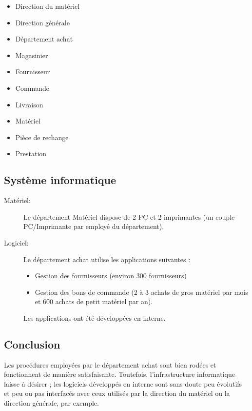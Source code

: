 \begin{itemize}
\item Direction du matériel
\item Direction générale
\item Département achat
\item Magasinier
\item Fournisseur
\item Commande
\item Livraison
\item Matériel
\item Pièce de rechange
\item Prestation
\end{itemize}


\subsection{Système informatique}

\begin{description}
    \item [Matériel:]\el
Le département Matériel dispose de 2 PC et 2 imprimantes (un couple
PC/Imprimante par employé du département).

    \item [Logiciel:]\el
Le département achat utilise les applications suivantes :
    \begin{itemize}
\item Gestion des fournisseurs (environ 300 fournisseurs)
\item Gestion des bons de commande (2 à 3 achats de gros matériel par mois
        et 600 achats de petit matériel par an).
    \end{itemize}

Les applications ont été développées en interne.

\end{description}

\subsection{Conclusion}

Les procédures employées par le département achat sont bien rodées et
fonctionnent de manière satisfaisante. Toutefois, l'infrastructure
informatique laisse à désirer ; les logiciels développés en interne sont
sans doute peu évolutifs et peu ou pas interfacés avec ceux utilisés par la
direction du matériel ou la direction générale, par exemple.

\vfill
\pagebreak
